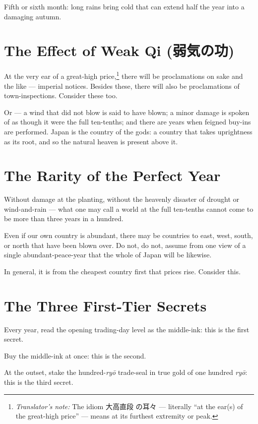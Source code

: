 \documentclass[10pt, openany]{book}
\newcommand{\jp}[1]{{\japanesefont #1}}
\newcommand{\tn}[1]{\footnote{\textit{Translator's note:} #1}}
\begin{document}
Fifth or sixth month: long rains bring cold that can extend half
the year into a damaging autumn.

\section{The Effect of Weak Qi (\jp{弱気の功})}

At the very ear of a great-high price,\tn{The idiom \jp{大高直段
の耳々} --- literally ``at the ear(s) of the great-high price'' ---
means at its furthest extremity or peak.} there will be proclamations
on sake and the like --- imperial notices. Besides these, there
will also be proclamations of town-inspections. Consider these
too.

Or --- a wind that did not blow is said to have blown; a minor
damage is spoken of as though it were the full ten-tenths; and
there are years when feigned buy-ins are performed. Japan is the
country of the gods: a country that takes uprightness as its root,
and so the natural heaven is present above it.

\section{The Rarity of the Perfect Year}

Without damage at the planting, without the heavenly disaster of
drought or wind-and-rain --- what one may call a world at the full
ten-tenths cannot come to be more than three years in a hundred.

Even if our own country is abundant, there may be countries to
east, west, south, or north that have been blown over. Do not, do
not, assume from one view of a single abundant-peace-year that the
whole of Japan will be likewise.

In general, it is from the cheapest country first that prices
rise. Consider this.

\section{The Three First-Tier Secrets}

Every year, read the opening trading-day level as the middle-ink:
this is the first secret.

Buy the middle-ink at once: this is the second.

At the outset, stake the hundred-\textit{ry\=o} trade-seal in
true gold of one hundred \textit{ry\=o}: this is the third
secret.
\end{document}
